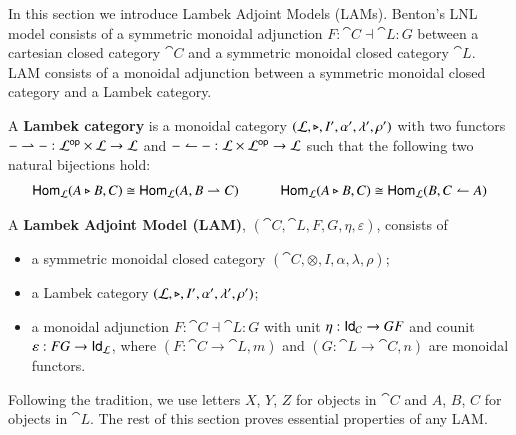In this section we introduce Lambek Adjoint Models (LAMs). Benton's
LNL model consists of a symmetric monoidal adjunction
$F:\cat{C}\dashv\cat{L}:G$ between a cartesian closed category
$\cat{C}$ and a symmetric monoidal closed category $\cat{L}$. LAM
consists of a monoidal adjunction between a symmetric monoidal closed
category and a Lambek category.
\begin{definition}
  \label{def:lambek-category}
  A \textbf{Lambek category} is a monoidal category $(\mathcal{L},\triangleright,I',\alpha',\lambda',\rho')$
  with two functors $- \rightharpoonup - : \mathcal{L}^{\mathsf{op}} \times \mathcal{L} \rightarrow \mathcal{L}$ and
  $- \leftharpoonup - : \mathcal{L} \times \mathcal{L}^{\mathsf{op}} \rightarrow \mathcal{L}$ such that the following
  two natural bijections hold:
  \[
  \begin{array}{lllll}
    \mathsf{Hom}_{\mathcal{L}}(A \triangleright B,C) \cong \mathsf{Hom}_{\mathcal{L}}(A,B \rightharpoonup C) & \quad &
    \mathsf{Hom}_{\mathcal{L}}(A \triangleright B,C) \cong \mathsf{Hom}_{\mathcal{L}}(B,C \leftharpoonup A)\\
  \end{array}
  \]  
\end{definition}

\begin{definition}
  A \textbf{Lambek Adjoint Model (LAM)}, $(\cat{C},\cat{L},F,G,\eta,\varepsilon)$, consists of
  \begin{itemize}
  \item a symmetric monoidal closed category $(\cat{C},\otimes,I,\alpha,\lambda,\rho)$;
  \item a Lambek category $(\mathcal{L},\triangleright,I',\alpha',\lambda',\rho')$;
  \item a monoidal adjunction $F:\cat{C}\dashv\cat{L}:G$ with unit $\eta:\mathsf{Id}_{\mathcal{C}} \rightarrow GF$ and
        counit $\varepsilon:FG\rightarrow \mathsf{Id}_{\mathcal{L}}$, where $(F:\cat{C}\rightarrow\cat{L}, m)$
        and $(G:\cat{L}\rightarrow\cat{C}, n)$ are monoidal functors.
  \end{itemize}
\end{definition}
\noindent
Following the tradition, we use letters $X$, $Y$, $Z$ for objects in
$\cat{C}$ and $A$, $B$, $C$ for objects in $\cat{L}$. The rest of this
section proves essential properties of any LAM.

